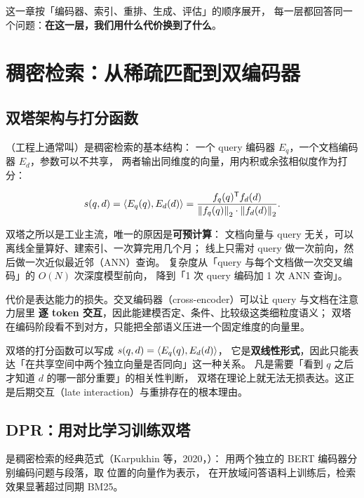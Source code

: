 这一章按「编码器、索引、重排、生成、评估」的顺序展开，
每一层都回答同一个问题：\textbf{在这一层，我们用什么代价换到了什么}。

\section{稠密检索：从稀疏匹配到双编码器}

\subsection{双塔架构与打分函数}

（工程上通常叫）是稠密检索的基本结构：
一个 query 编码器 $E_q$，一个文档编码器 $E_d$，参数可以不共享，
两者输出同维度的向量，用内积或余弦相似度作为打分：

\begin{equation}
s(q, d) = \left\langle E_q(q), E_d(d) \right\rangle = \frac{f_q(q)^{\mathsf{T}} f_d(d)}{\left\lVert f_q(q) \right\rVert_2 \cdot \left\lVert f_d(d) \right\rVert_2} .
\label{eq:dual-encoder-score}
\end{equation}

双塔之所以是工业主流，唯一的原因是\textbf{可预计算}：
文档向量与 query 无关，可以离线全量算好、建索引、一次算完用几个月；
线上只需对 query 做一次前向，然后做一次近似最近邻（ANN）查询。
复杂度从「query 与每个文档做一次交叉编码」的 $O(N)$ 次深度模型前向，
降到「1 次 query 编码加 1 次 ANN 查询」。

代价是表达能力的损失。交叉编码器（cross-encoder）可以让 query 与文档在注意力层里
\textbf{逐 token 交互}，因此能建模否定、条件、比较级这类细粒度语义；
双塔在编码阶段看不到对方，只能把全部语义压进一个固定维度的向量里。

\begin{formulacard}[双塔的表达能力上限]
双塔的打分函数可以写成 $s(q,d) = \left\langle E_q(q), E_d(d) \right\rangle$，
它是\textbf{双线性形式}，因此只能表达「在共享空间中两个独立向量是否同向」这一种关系。
凡是需要「看到 $q$ 之后才知道 $d$ 的哪一部分重要」的相关性判断，
双塔在理论上就无法无损表达。这正是后期交互（late interaction）与重排存在的根本理由。
\end{formulacard}

\subsection{DPR：用对比学习训练双塔}

 是稠密检索的经典范式（Karpukhin 等，2020，\cite{karpukhin2020dpr}）：
用两个独立的 BERT 编码器分别编码问题与段落，取 \code{[CLS]} 位置的向量作为表示，
在开放域问答语料上训练后，检索效果显著超过同期 BM25。

